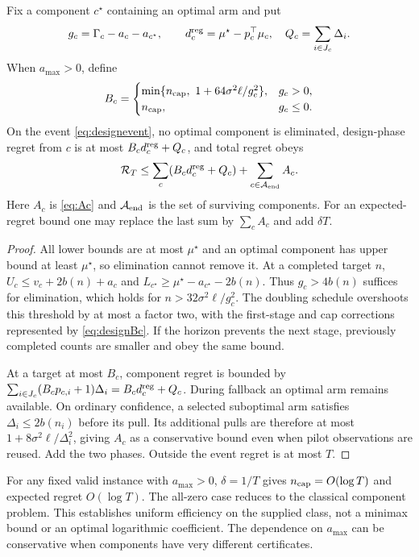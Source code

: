 \begin{theorem}
Fix a component $c^\star$ containing an optimal arm and put
\begin{equation}
 g_c=\Gamma_c-a_c-a_{c^\star},\qquad
 d_c^{\rm reg}=\mu^\star-p_c^\top\mu_c,
 \quad Q_c=\sum_{i\in J_c}\Delta_i.
\end{equation}
When $a_{\max}>0$, define
\begin{equation}
 B_c=\begin{cases}
 \min\{n_{\rm cap},\ 1+64\sigma^2\ell/g_c^2\},&g_c>0,\\
 n_{\rm cap},&g_c\le0.
 \end{cases}
 \label{eq:designBc}
\end{equation}
On the event \eqref{eq:designevent}, no optimal component is eliminated, design-phase regret from $c$ is at most $B_cd_c^{\rm reg}+Q_c$, and total regret obeys
\begin{equation}
 \mathcal R_T\le\sum_c(B_cd_c^{\rm reg}+Q_c)
       +\sum_{c\in\mathcal A_{\rm end}}A_c.
 \label{eq:designregret}
\end{equation}
Here $A_c$ is \eqref{eq:Ac} and $\mathcal A_{\rm end}$ is the set of surviving components. For an expected-regret bound one may replace the last sum by $\sum_cA_c$ and add $\delta T$.
\label{thm:designregret}
\end{theorem}
\begin{proof}
All lower bounds are at most $\mu^\star$ and an optimal component has upper bound at least $\mu^\star$, so elimination cannot remove it. At a completed target $n$,
$U_c\le v_c+2b(n)+a_c$ and
$L_{c^\star}\ge\mu^\star-a_{c^\star}-2b(n)$.
Thus $g_c>4b(n)$ suffices for elimination, which holds for
$n>32\sigma^2\ell/g_c^2$. The doubling schedule overshoots this threshold by at most a factor two, with the first-stage and cap corrections represented by \eqref{eq:designBc}. If the horizon prevents the next stage, previously completed counts are smaller and obey the same bound.

At a target at most $B_c$, component regret is bounded by
$\sum_{i\in J_c}(B_cp_{c,i}+1)\Delta_i=B_cd_c^{\rm reg}+Q_c$.
During fallback an optimal arm remains available. On ordinary confidence, a selected suboptimal arm satisfies $\Delta_i\le2b(n_i)$ before its pull. Its additional pulls are therefore at most $1+8\sigma^2\ell/\Delta_i^2$, giving $A_c$ as a conservative bound even when pilot observations are reused. Add the two phases. Outside the event regret is at most $T$.
\end{proof}
For any fixed valid instance with $a_{\max}>0$, $\delta=1/T$ gives $n_{\rm cap}=O(\log T)$ and expected regret $O(\log T)$. The all-zero case reduces to the classical component problem. This establishes uniform efficiency on the supplied class, not a minimax bound or an optimal logarithmic coefficient. The dependence on $a_{\max}$ can be conservative when components have very different certificates.

